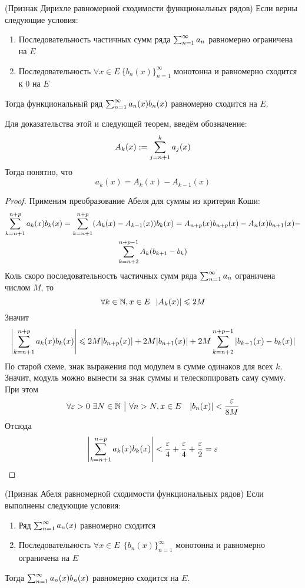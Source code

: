 \begin{theorem} (Признак Дирихле равномерной сходимости функциональных рядов)
	Если верны следующие условия:
	\begin{enumerate}
		\item Последовательность частичных сумм ряда $\sum_{n = 1}^\infty a_n$ равномерно ограничена на $E$
		
		\item Последовательность $\forall x \in E\ \{b_n(x)\}_{n = 1}^\infty$ монотонна и равномерно сходится к 0 на $E$
	\end{enumerate}
	Тогда функциональный ряд $\sum_{n = 1}^\infty a_n(x)b_n(x)$ равномерно сходится на $E$.
\end{theorem}

\begin{note}
	Для доказательства этой и следующей теорем, введём обозначение:
	\[
		A_k(x) := \sum\limits_{j = n + 1}^k a_j(x)
	\]
	Тогда понятно, что
	\[
		a_k(x) = A_k(x) - A_{k - 1}(x)
	\]
\end{note}

\begin{proof}
	Применим преобразование Абеля для суммы из критерия Коши:
	\begin{multline*}
		\sum\limits_{k = n + 1}^{n + p} a_k(x)b_k(x) = \sum\limits_{k = n + 1}^{n + p} (A_k(x) - A_{k - 1}(x))b_k(x) = A_{n + p}(x) b_{n + p}(x) - A_n(x)b_{n + 1}(x) -
		\\
		\sum\limits_{k = n + 2}^{n + p - 1} A_k(b_{k + 1} - b_k)
	\end{multline*}
	Коль скоро последовательность частичных сумм ряда $\sum_{n = 1}^\infty a_n$ ограничена числом $M$, то
	\[
		\forall k \in \mathbb{N}, x \in E\ \ |A_k(x)| \leqslant 2M
	\]
	Значит
	\[
		\left|\sum\limits_{k = n + 1}^{n + p} a_k(x)b_k(x)\right| \leqslant 2M |b_{n + p}(x)| + 2M |b_{n + 1}(x)| + 2M \sum\limits_{k = n + 2}^{n + p - 1} |b_{k + 1}(x) - b_k(x)|
	\]
	По старой схеме, знак выражения под модулем в сумме одинаков для всех $k$. Значит, модуль можно вынести за знак суммы и телескопировать саму сумму. При этом
	\[
		\forall \varepsilon > 0\ \exists N \in \mathbb{N} \ \big|\  \forall n > N, x \in E \quad |b_n(x)| < \frac{\varepsilon}{8M}
	\]
	Отсюда
	\[
		\left|\sum\limits_{k = n + 1}^{n + p} a_k(x)b_k(x)\right| < \frac{\varepsilon}{4} + \frac{\varepsilon}{4} + \frac{\varepsilon}{2} = \varepsilon
	\]
\end{proof}

\begin{theorem} (Признак Абеля равномерной сходимости функциональных рядов)
	Если выполнены следующие условия:
	\begin{enumerate}
		\item Ряд $\sum_{n = 1}^\infty a_n(x)$ равномерно сходится
		
		\item Последовательность $\forall x \in E\ \ \{b_n(x)\}_{n = 1}^\infty$ монотонна и равномерно ограничена на $E$
	\end{enumerate}
	Тогда $\sum_{n = 1}^\infty a_n(x)b_n(x)$ равномерно сходится на $E$.
\end{theorem}

